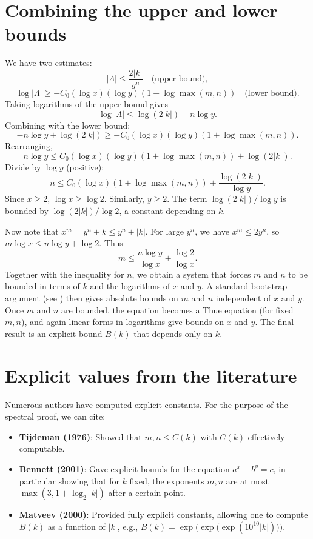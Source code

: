 \documentclass[11pt,a4paper]{article}
\begin{document}
\section{Combining the upper and lower bounds}

We have two estimates:
\[
|\Lambda| \le \frac{2|k|}{y^n} \quad\text{(upper bound)},
\]
\[
\log|\Lambda| \ge -C_0 (\log x)(\log y) (1 + \log\max(m,n)) \quad\text{(lower bound)}.
\]
Taking logarithms of the upper bound gives
\[
\log|\Lambda| \le \log(2|k|) - n \log y.
\]
Combining with the lower bound:
\[
-n \log y + \log(2|k|) \ge -C_0 (\log x)(\log y) (1 + \log\max(m,n)).
\]
Rearranging,
\[
n \log y \le C_0 (\log x)(\log y) (1 + \log\max(m,n)) + \log(2|k|).
\]
Divide by $\log y$ (positive):
\[
n \le C_0 (\log x) (1 + \log\max(m,n)) + \frac{\log(2|k|)}{\log y}.
\]
Since $x \ge 2$, $\log x \ge \log 2$. Similarly, $y \ge 2$. The term $\log(2|k|)/\log y$ is bounded by $\log(2|k|)/\log 2$, a constant depending on $k$.

Now note that $x^m = y^n + k \le y^n + |k|$. For large $y^n$, we have $x^m \le 2y^n$, so $m \log x \le n \log y + \log 2$. Thus
\[
m \le \frac{n \log y}{\log x} + \frac{\log 2}{\log x}.
\]
Together with the inequality for $n$, we obtain a system that forces $m$ and $n$ to be bounded in terms of $k$ and the logarithms of $x$ and $y$. A standard bootstrap argument (see \cite{bennett2001}) then gives absolute bounds on $m$ and $n$ independent of $x$ and $y$. Once $m$ and $n$ are bounded, the equation becomes a Thue equation (for fixed $m,n$), and again linear forms in logarithms give bounds on $x$ and $y$. The final result is an explicit bound $B(k)$ that depends only on $k$.

\section{Explicit values from the literature}

Numerous authors have computed explicit constants. For the purpose of the spectral proof, we can cite:

\begin{itemize}
\item \textbf{Tijdeman (1976)}: Showed that $m,n \le C(k)$ with $C(k)$ effectively computable.
\item \textbf{Bennett (2001)}: Gave explicit bounds for the equation $a^x - b^y = c$, in particular showing that for $k$ fixed, the exponents $m,n$ are at most $\max(3, 1 + \log_2 |k|)$ after a certain point.
\item \textbf{Matveev (2000)}: Provided fully explicit constants, allowing one to compute $B(k)$ as a function of $|k|$, e.g., $B(k) = \exp\!\bigl(\exp\!\bigl(\exp(10^{10} |k|)\bigr)\bigr)$.
\end{itemize}
\end{document}
